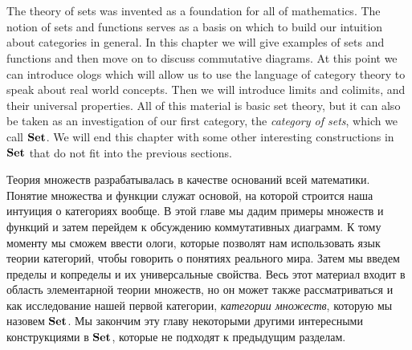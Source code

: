 
\chapter{}\label{chap:sets}

\begin{blockENG}
The theory of sets was invented as a foundation for all of mathematics. The notion of sets and functions serves as a basis on which to build our intuition about categories in general. In this chapter we will give examples of sets and functions and then move on to discuss commutative diagrams. At this point we can introduce ologs which will allow us to use the language of category theory to speak about real world concepts. Then we will introduce limits and colimits, and their universal properties. All of this material is basic set theory, but it can also be taken as an investigation of our first category, the {\em category of sets}, which we call ${\bf Set}$. We will end this chapter with some other interesting constructions in ${\bf Set}$ that do not fit into the previous sections.
\end{blockENG}

\begin{blockRUS}
Теория множеств разрабатывалась в качестве оснований всей математики. Понятие множества и функции служат основой, на которой строится наша интуиция о категориях вообще. В этой главе мы дадим примеры множеств и функций и затем перейдем к обсуждению коммутативных диаграмм. К тому моменту мы сможем ввести ологи, которые позволят нам использовать язык теории категорий, чтобы говорить о понятиях реального мира. Затем мы введем пределы и копределы и их универсальные свойства. Весь этот материал входит в область элементарной теории множеств, но он может также рассматриваться и как исследование нашей первой категории, {\em категории множеств}, которую мы назовем ${\bf Set}$. Мы закончим эту главу некоторыми другими интересными конструкциями в ${\bf Set}$, которые не подходят к предыдущим разделам.%
\end{blockRUS}

